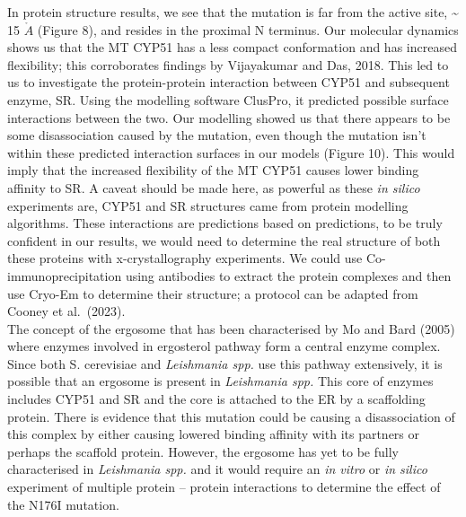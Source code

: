\documentclass{bioinfo}
\begin{document}
In protein structure results, we see that the mutation is far from the
active site, \textasciitilde{} 15 \(\mathring{A}\) (Figure 8), and
resides in the proximal N terminus. Our molecular dynamics shows us that
the MT CYP51 has a less compact conformation and has increased
flexibility; this corroborates findings by Vijayakumar and Das, 2018.
This led to us to investigate the protein-protein interaction between
CYP51 and subsequent enzyme, SR. Using the modelling software ClusPro,
it predicted possible surface interactions between the two. Our
modelling showed us that there appears to be some disassociation caused
by the mutation, even though the mutation isn't within these predicted
interaction surfaces in our models (Figure 10). This would imply that
the increased flexibility of the MT CYP51 causes lower binding affinity
to SR. A caveat should be made here, as powerful as these \emph{in
silico} experiments are, CYP51 and SR structures came from protein
modelling algorithms. These interactions are predictions based on
predictions, to be truly confident in our results, we would need to
determine the real structure of both these proteins with
x-crystallography experiments. We could use Co-immunoprecipitation using
antibodies to extract the protein complexes and then use Cryo-Em to
determine their structure; a protocol can be adapted from Cooney et
al.~(2023).\\

The concept of the ergosome that has been characterised by Mo and Bard
(2005) where enzymes involved in ergosterol pathway form a central
enzyme complex. Since both S. cerevisiae and \emph{Leishmania spp.} use
this pathway extensively, it is possible that an ergosome is present in
\emph{Leishmania spp.} This core of enzymes includes CYP51 and SR and
the core is attached to the ER by a scaffolding protein. There is
evidence that this mutation could be causing a disassociation of this
complex by either causing lowered binding affinity with its partners or
perhaps the scaffold protein. However, the ergosome has yet to be fully
characterised in \emph{Leishmania spp.} and it would require an \emph{in
vitro} or \emph{in silico} experiment of multiple protein -- protein
interactions to determine the effect of the N176I mutation.\\
\end{document}
